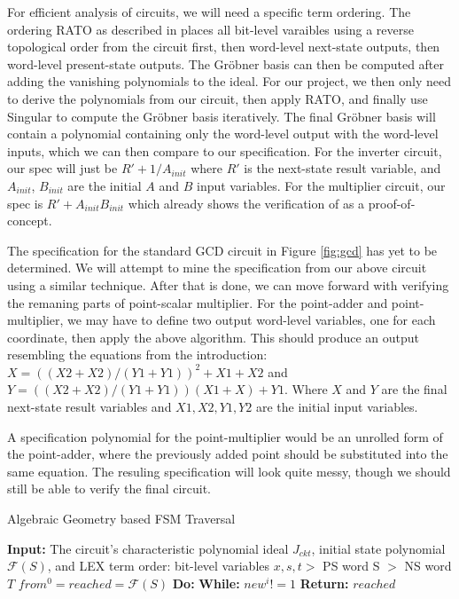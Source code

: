\documentclass[12pt]{report}
\begin{document}
For efficient analysis of circuits, we will need a specific term ordering. The ordering RATO as described in \cite{Kalla} places all bit-level varaibles using a reverse topological order from the circuit first, then word-level next-state outputs, then word-level present-state outputs. The Gr{\"o}bner basis can then be computed after adding the vanishing polynomials to the ideal. For our project, we then only need to derive the polynomials from our circuit, then apply RATO, and finally use Singular to compute the Gr{\"o}bner basis iteratively. The final Gr{\"o}bner basis will contain a polynomial containing only the word-level output with the word-level inputs, which we can then compare to our specification. For the inverter circuit, our spec will just be $R' + 1/A_{init}$ where $R'$ is the next-state result variable, and $A_{init}$, $B_{init}$ are the initial $A$ and $B$ input variables. For the multiplier circuit, our spec is $R' + A_{init}B_{init}$ which \cite{Kalla} already shows the verification of as a proof-of-concept. 

The specification for the standard GCD circuit in Figure \ref{fig:gcd} has yet to be determined. We will attempt to mine the specification from our above circuit using a similar technique. After that is done, we can move forward with verifying the remaning parts of point-scalar multiplier. For the point-adder and point-multiplier, we may have to define two output word-level variables, one for each coordinate, then apply the above algorithm. This should produce an output resembling the equations from the introduction: $X = ((X2 + X2)/(Y1+Y1))^2 + X1 + X2$ and $Y = ((X2 + X2)/(Y1 + Y1))(X1 + X) + Y1$. Where $X$ and $Y$ are the final next-state result variables and $X1, X2, Y1, Y2$ are the initial input variables. 

A specification polynomial for the point-multiplier would be an unrolled form of the point-adder, where the previously added point should be substituted into the same equation. The resuling specification will look quite messy, though we should still be able to verify the final circuit.

\iffalse %
\begin{algorithm}
\caption{Algebraic Geometry based FSM Traversal}
{\textbf{Input:} The circuit's characteristic polynomial ideal $J_{ckt}$, initial state polynomial $\mathcal{F}(S)$, and LEX term order: bit-level variables $x,s,t >$ PS word S $>$ NS word $T$}
{$from^0=reached=\mathcal{F}(S)$}
{\textbf{Do:}}
\hspace*{6mm}{$i \leftarrow i + 1 $}
\hspace*{6mm}{$reached \leftarrow reached*new^i$}
\hspace*{6mm}{$from^i \leftarrow new^i(S$/$T)$}
{\textbf{While:} $new^i != 1$}
{\textbf{Return:} $reached$}

\end{algorithm}
\end{document}
